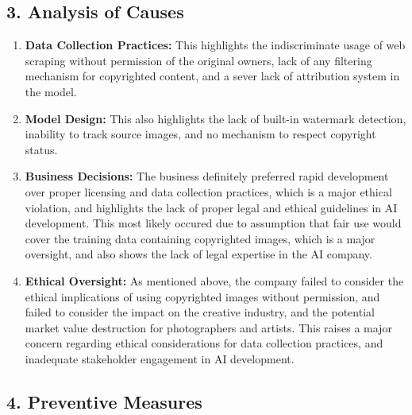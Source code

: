 \documentclass{article}
\theoremstyle{mytheoremstyle}
\theoremstyle{mytheoremstyle}
\theoremstyle{myproblemstyle}
\begin{document}
\subsection*{3. Analysis of Causes}

\begin{enumerate}
    \item \textbf{Data Collection Practices:} This highlights the indiscriminate usage of web scraping without permission of the original owners, lack of any filtering mechanism for copyrighted content, and a sever lack of attribution system in the model. 
    \item \textbf{Model Design:} This also highlights the lack of built-in watermark detection, inability to track source images, and no mechanism to respect copyright status. 
    \item \textbf{Business Decisions:} The business definitely preferred rapid development over proper licensing and data collection practices, which is a major ethical violation, and highlights the lack of proper legal and ethical guidelines in AI development. This most likely occured due to assumption that fair use would cover the training data containing copyrighted images, which is a major oversight, and also shows the lack of legal expertise in the AI company.
    \item \textbf{Ethical Oversight:} As mentioned above, the company failed to consider the ethical implications of using copyrighted images without permission, and failed to consider the impact on the creative industry, and the potential market value destruction for photographers and artists. This raises a major concern regarding ethical considerations for data collection practices, and inadequate stakeholder engagement in AI development.
\end{enumerate}

\subsection*{4. Preventive Measures}
\end{document}
